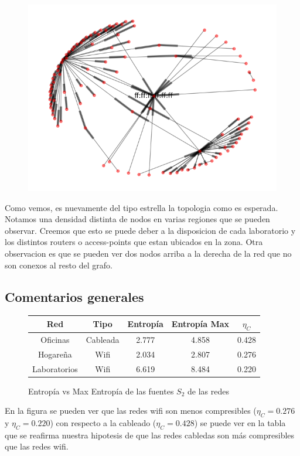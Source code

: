 \begin{figure}[hp!]
	\begin{center}
	 \includegraphics[scale=0.6]{../plots/labos_s2_topologia.png}
	\end{center}
\end{figure}

Como vemos, es nuevamente del tipo estrella la topologia como es esperada. Notamos una densidad
distinta de nodos en varias regiones que se pueden observar. Creemos que esto se puede deber
a la disposicion de cada laboratorio y los distintos routers o access-points que estan ubicados en la zona.
Otra observacion es que se pueden ver dos nodos arriba a la derecha de la red que no son conexos al resto del grafo.


\clearpage

\subsection{Comentarios generales}

\begin{figure}[hp!]
	\centering
	\begin{tabular}{|c|c|c|c|c|}
		\hline
		Red & Tipo & Entropía & Entropía Max & $\eta_{C}$ \\
		\hline
		Oficinas & Cableada & 2.777 & 4.858 & 0.428 \\
		\hline
		Hogareña & Wifi & 2.034 & 2.807 & 0.276 \\
		\hline
		Laboratorios & Wifi & 6.619 & 8.484 & 0.220 \\
		\hline
	\end{tabular}
	\caption[fig:tabla]{Entropía vs Max Entropía de las fuentes $S_2$ de las redes}
\end{figure}

En la figura \label{fig:tabla} se pueden ver que las redes wifi son menos compresibles ($\eta_{C}=0.276$ y $\eta_{C}=0.220$)
con respecto a la cableado ($\eta_{C}=0.428$) se puede ver en la tabla que se
reafirma nuestra hipotesis de que las redes cabledas son más compresibles que
las redes wifi.
